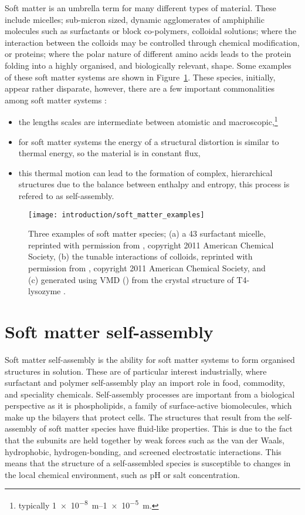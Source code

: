 Soft matter is an umbrella term for many different types of material.
These include micelles; sub-micron sized, dynamic agglomerates of amphiphilic molecules such as surfactants or block co-polymers, colloidal solutions; where the interaction between the colloids may be controlled through chemical modification, or proteins; where the polar nature of different amino acids leads to the protein folding into a highly organised, and biologically relevant, shape.
Some examples of these soft matter systems are shown in Figure~\ref{fig:soft}.
These species, initially, appear rather disparate, however, there are a few important commonalities among soft matter systems \autocite{jones_soft_2002}:
\begin{itemize}
  \item the lengths scales are intermediate between atomistic and macroscopic,\footnote{typically \SIrange{1e-8}{1e-5}{\meter}.}
  \item for soft matter systems the energy of a structural distortion is similar to thermal energy, so the material is in constant flux,
  \item this thermal motion can lead to the formation of complex, hierarchical structures due to the balance between enthalpy and entropy, this process is refered to as self-assembly.
\end{itemize}
%
\begin{figure}
    \centering
    \texttt{[image: introduction/soft\_matter\_examples]}
    \caption{Three examples of soft matter species; (a) a 43  surfactant micelle, reprinted with permission from \cite{hargreaves_atomistic_2011}, copyright 2011 American Chemical Society, (b) the tunable interactions of colloids, reprinted with permission from \cite{kraft_patchy_2011}, copyright 2011 American Chemical Society, and (c) generated using VMD (\cite{humphrey_vmd_1996}) from the crystal structure of T4-lysozyme \cite{rose_crystal_1988}.}
    \label{fig:soft}
\end{figure}
%

\section{Soft matter self-assembly}
Soft matter self-assembly is the ability for soft matter systems to form organised structures in solution.
These are of particular interest industrially, where surfactant and polymer self-assembly play an import role in food, commodity, and speciality chemicals.\autocite{schramm_surfactants_2003}
Self-assembly processes are important from a biological perspective as it is phospholipids, a family of surface-active biomolecules, which make up the bilayers that protect cells.\autocite{simons_lipid_2000}
The structures that result from the self-assembly of soft matter species have fluid-like properties.
This is due to the fact that the subunits are held together by weak forces such as the van der Waals, hydrophobic, hydrogen-bonding, and screened electrostatic interactions.\autocite{israelachvili_intermolecular_2011}
This means that the structure of a self-assembled species is susceptible to changes in the local chemical environment, such as pH or salt concentration.\autocite{schmaljohann_thermo-_2006,sammalkorpi_ionic_2009}

